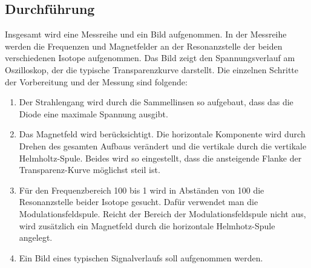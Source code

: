 \subsection{Durchführung}
Insgesamt wird eine Messreihe und ein Bild aufgenommen. In der Messreihe werden die Frequenzen und Magnetfelder an der Resonanzstelle der beiden verschiedenen Isotope aufgenommen. Das Bild zeigt den Spannungsverlauf am Oszilloskop, der die typische Transparenzkurve darstellt. Die einzelnen Schritte der Vorbereitung und der Messung sind folgende:
\begin{enumerate}
	\item Der Strahlengang wird durch die Sammellinsen so aufgebaut, dass das die Diode eine maximale Spannung ausgibt. 
	\item Das Magnetfeld wird berücksichtigt. Die horizontale Komponente wird durch Drehen des gesamten Aufbaus verändert und die vertikale durch die vertikale Helmholtz-Spule. Beides wird so eingestellt, dass die ansteigende Flanke der Transparenz-Kurve möglichst steil ist. 
	\item Für den Frequenzbereich \si{100}{\kilo\hertz} bis \si{1}{\mega\hertz} wird in Abständen von \si{100}{\kilo\hertz} die Resonanzstelle beider Isotope gesucht. Dafür verwendet man die Modulationsfeldspule. Reicht der Bereich der Modulationsfeldspule nicht aus, wird zusätzlich ein Magnetfeld durch die horizontale Helmhotz-Spule angelegt.
	\item Ein Bild eines typischen Signalverlaufs soll aufgenommen werden.
\end{enumerate}


